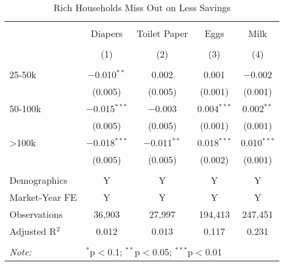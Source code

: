 
\begin{table}[!htbp] \centering
  \caption{Rich Households Miss Out on Less Savings}
  \label{tab:lowestPrice}
\begin{tabular}{@{\extracolsep{5pt}}lcccc}
\\[-1.8ex]\hline
\hline \\[-1.8ex]
 & Diapers & Toilet Paper & Eggs & Milk \\
\\[-1.8ex] & (1) & (2) & (3) & (4)\\
\hline \\[-1.8ex]
 25-50k & $-$0.010$^{**}$ & 0.002 & 0.001 & $-$0.002 \\
  & (0.005) & (0.005) & (0.001) & (0.001) \\
  50-100k & $-$0.015$^{***}$ & $-$0.003 & 0.004$^{***}$ & 0.002$^{**}$ \\
  & (0.005) & (0.005) & (0.001) & (0.001) \\
  >100k & $-$0.018$^{***}$ & $-$0.011$^{**}$ & 0.018$^{***}$ & 0.010$^{***}$ \\
  & (0.005) & (0.005) & (0.002) & (0.001) \\
 \hline \\[-1.8ex]
Demographics & Y & Y & Y & Y \\
Market-Year FE & Y & Y & Y & Y \\
Observations & 36,903 & 27,997 & 194,413 & 247,451 \\
Adjusted R$^{2}$ & 0.012 & 0.013 & 0.117 & 0.231 \\
\hline
\hline \\[-1.8ex]
\textit{Note:}  & \multicolumn{4}{l}{$^{*}$p$<$0.1; $^{**}$p$<$0.05; $^{***}$p$<$0.01} \\
\end{tabular}
\end{table}
